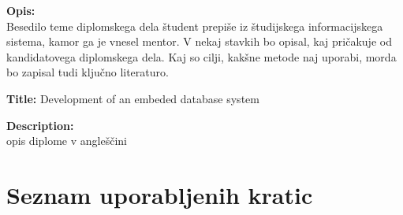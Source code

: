\documentclass[a4paper,12pt,openright]{book}
\newcommand{\clearemptydoublepage}{\newpage{\pagestyle{empty}\cleardoublepage}}
\begin{document}
\bigskip
\noindent\textbf{Opis:}\\
Besedilo teme diplomskega dela študent prepiše iz študijskega informacijskega sistema, kamor ga je vnesel mentor. 
V nekaj stavkih bo opisal, kaj pričakuje od kandidatovega diplomskega dela. 
Kaj so cilji, kakšne metode naj uporabi, morda bo zapisal tudi ključno literaturo.

\bigskip
\noindent\textbf{Title:} Development of an embeded database system

\bigskip
\noindent\textbf{Description:}\\
opis diplome v angleščini

\vfill



\vspace{2cm}

\clearemptydoublepage


\clearemptydoublepage


\clearemptydoublepage


\setcounter{tocdepth}{4}
\pagestyle{empty}
\def\thepage{}%
\tableofcontents{}


\clearemptydoublepage


\chapter*{Seznam uporabljenih kratic}
\end{document}
